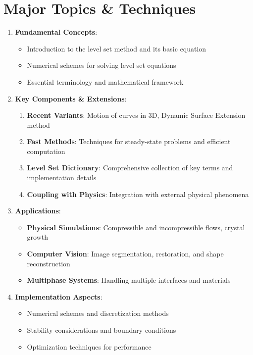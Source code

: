 \documentclass[12pt]{article}
\begin{document}
\section{Major Topics \& Techniques}
\begin{enumerate}[noitemsep]
    \item \textbf{Fundamental Concepts}:
    \begin{itemize}[noitemsep]
        \item Introduction to the level set method and its basic equation
        \item Numerical schemes for solving level set equations
        \item Essential terminology and mathematical framework
    \end{itemize}
    \item \textbf{Key Components \& Extensions}:
    \begin{enumerate}[label=\alph*), noitemsep]
        \item \textbf{Recent Variants}: Motion of curves in 3D, Dynamic Surface Extension method
        \item \textbf{Fast Methods}: Techniques for steady-state problems and efficient computation
        \item \textbf{Level Set Dictionary}: Comprehensive collection of key terms and implementation details
        \item \textbf{Coupling with Physics}: Integration with external physical phenomena
    \end{enumerate}
    \item \textbf{Applications}:
    \begin{itemize}[noitemsep]
        \item \textbf{Physical Simulations}: Compressible and incompressible flows, crystal growth
        \item \textbf{Computer Vision}: Image segmentation, restoration, and shape reconstruction
        \item \textbf{Multiphase Systems}: Handling multiple interfaces and materials
    \end{itemize}
    \item \textbf{Implementation Aspects}:
    \begin{itemize}[noitemsep]
        \item Numerical schemes and discretization methods
        \item Stability considerations and boundary conditions
        \item Optimization techniques for performance
    \end{itemize}
\end{enumerate}
\end{document}
